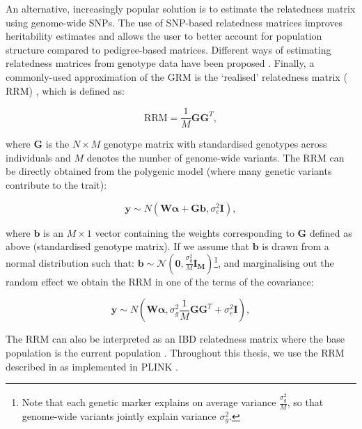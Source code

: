 An alternative, increasingly popular solution is to estimate the relatedness matrix using genome-wide SNPs. 
The use of SNP-based relatedness matrices improves heritability estimates \cite{visscher2006assumption, visscher2007genome, hayes2009increased} and allows the user to better account for population structure \cite{kang2008efficient, lee2010using} compared to pedigree-based matrices. 
Different ways of estimating relatedness matrices from genotype data have been proposed \cite{oliehoek2006estimating, purcell2007plink, vanraden2008efficient}. 
Finally, a commonly-used approximation of the GRM is the `realised' relatedness matrix ($\mathrm{RRM}$) \cite{hayes2009increased}, which is defined as:

 \begin{equation}
    \mathrm{RRM} = \frac{1}{M}\mathbf{G}\mathbf{G}^T,
\end{equation}

where $\mathbf{G}$ is the $N \times M$ genotype matrix with standardised genotypes across individuals and $M$ denotes the number of genome-wide variants. 
The $\mathrm{RRM}$ can be directly obtained from the polygenic model (where many genetic variants contribute to the trait):

\begin{equation}\label{eq:polygenic_model}
    \mathbf{y} \sim N (\mathbf{W}\boldsymbol{\alpha} +  \mathbf{G}\mathbf{b}, \sigma_e^2\mathbf{I}),
\end{equation}

where $\mathbf{b}$ is an $M \times 1$ vector containing the weights corresponding to $\mathbf{G}$ defined as above (standardised genotype matrix).
If we assume that $\mathbf{b}$ is drawn from a normal distribution such that: $\mathbf{b} \sim \mathcal{N}(\mathbf{0}, \frac{\sigma_g^2}{M} \mathbf{I_M})$\footnote{Note that each genetic marker explains on average variance $\frac{\sigma_g^2}{M}$, so that genome-wide variants jointly explain variance $\sigma_g^2$.}, and marginalising out the random effect we obtain the RRM in one of the terms of the covariance:

\begin{equation}\label{eq:polygenic_model_MVN}
    \mathbf{y} \sim N (\mathbf{W}\boldsymbol{\alpha}, \sigma_g^2\frac{1}{M}\mathbf{G}\mathbf{G}^T + \sigma_e^2\mathbf{I} ),
\end{equation}

The $\mathrm{RRM}$ can also be interpreted as an IBD relatedness matrix where the base population
is the current population \cite{powell2010reconciling}. 
Throughout this thesis, we use the $\mathrm{RRM}$ described in \cite{yang2011gcta} as implemented in PLINK \cite{purcell2007plink}.


